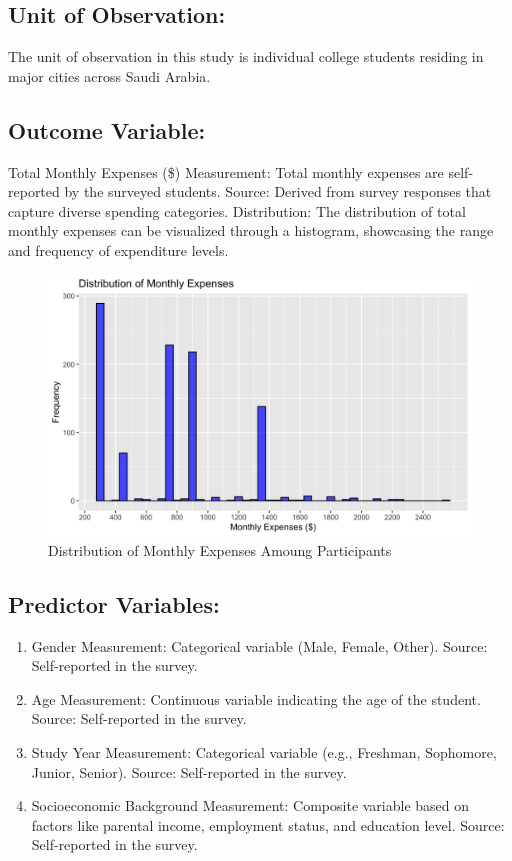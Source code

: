 \documentclass[
]{article}
\providecommand{\tightlist}{%
  \setlength{\itemsep}{0pt}\setlength{\parskip}{0pt}}
\begin{document}
\hypertarget{unit-of-observation}{%
\subsection{Unit of Observation:}\label{unit-of-observation}}

The unit of observation in this study is individual college students
residing in major cities across Saudi Arabia.

\hypertarget{outcome-variable}{%
\subsection{Outcome Variable:}\label{outcome-variable}}

Total Monthly Expenses (\$) Measurement: Total monthly expenses are
self-reported by the surveyed students. Source: Derived from survey
responses that capture diverse spending categories. Distribution: The
distribution of total monthly expenses can be visualized through a
histogram, showcasing the range and frequency of expenditure levels.

\begin{figure}
\centering
\includegraphics{Distribution_of_Monthly_Expenses.png}
\caption{Distribution of Monthly Expenses Amoung Participants}
\end{figure}

\hypertarget{predictor-variables}{%
\subsection{Predictor Variables:}\label{predictor-variables}}

\begin{enumerate}
\def\labelenumi{\arabic{enumi}.}
\tightlist
\item
  Gender Measurement: Categorical variable (Male, Female, Other).
  Source: Self-reported in the survey.
\item
  Age Measurement: Continuous variable indicating the age of the
  student. Source: Self-reported in the survey.
\item
  Study Year Measurement: Categorical variable (e.g., Freshman,
  Sophomore, Junior, Senior). Source: Self-reported in the survey.
\item
  Socioeconomic Background Measurement: Composite variable based on
  factors like parental income, employment status, and education level.
  Source: Self-reported in the survey.
\end{enumerate}
\end{document}
